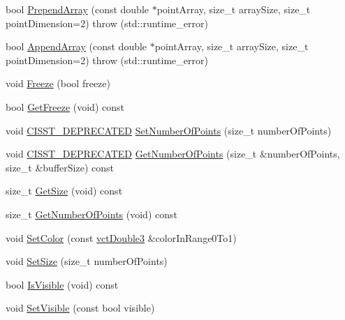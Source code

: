 \begin{DoxyCompactItemize}
\item 
bool \hyperlink{classvct_plot2_d_base_1_1_signal_a3a94c6565eb51445019fb41c4f1dc620}{Prepend\+Array} (const double $\ast$point\+Array, size\+\_\+t array\+Size, size\+\_\+t point\+Dimension=2)  throw (std\+::runtime\+\_\+error)
\item 
bool \hyperlink{classvct_plot2_d_base_1_1_signal_a3ca34a96793c8205973b5e21f6ccee83}{Append\+Array} (const double $\ast$point\+Array, size\+\_\+t array\+Size, size\+\_\+t point\+Dimension=2)  throw (std\+::runtime\+\_\+error)
\item 
void \hyperlink{classvct_plot2_d_base_1_1_signal_a64e25eabe599bfee8ce41e3bb413d10a}{Freeze} (bool freeze)
\item 
bool \hyperlink{classvct_plot2_d_base_1_1_signal_af589f83e274a70f465a700ddb33d95cd}{Get\+Freeze} (void) const 
\item 
void \hyperlink{cmn_portability_8h_a63da7164735f9501be651b1f2bbc0121}{C\+I\+S\+S\+T\+\_\+\+D\+E\+P\+R\+E\+C\+A\+T\+E\+D} \hyperlink{classvct_plot2_d_base_1_1_signal_ac2bc150d895d678d753ac2dd3e99ce25}{Set\+Number\+Of\+Points} (size\+\_\+t number\+Of\+Points)
\item 
void \hyperlink{cmn_portability_8h_a63da7164735f9501be651b1f2bbc0121}{C\+I\+S\+S\+T\+\_\+\+D\+E\+P\+R\+E\+C\+A\+T\+E\+D} \hyperlink{classvct_plot2_d_base_1_1_signal_aa85a26d0ae7863acb04f2d14cb5ed5a5}{Get\+Number\+Of\+Points} (size\+\_\+t \&number\+Of\+Points, size\+\_\+t \&buffer\+Size) const 
\item 
size\+\_\+t \hyperlink{classvct_plot2_d_base_1_1_signal_a3b291e4f8bcfe303086303cabea7ab1d}{Get\+Size} (void) const 
\item 
size\+\_\+t \hyperlink{classvct_plot2_d_base_1_1_signal_aae57a98944162e9eff828fcb35976ae5}{Get\+Number\+Of\+Points} (void) const 
\item 
void \hyperlink{classvct_plot2_d_base_1_1_signal_a0eae059cf46cd21594b8b30082a31a7c}{Set\+Color} (const \hyperlink{vct_fixed_size_vector_types_8h_a4a89122c9d7f72c3f31fe8126e17c3af}{vct\+Double3} \&color\+In\+Range0\+To1)
\item 
void \hyperlink{classvct_plot2_d_base_1_1_signal_ad3e1cca15d592cd22788ec4260da9de5}{Set\+Size} (size\+\_\+t number\+Of\+Points)
\item 
bool \hyperlink{classvct_plot2_d_base_1_1_signal_a106f7f6083ecde72ddbcfa923febc01f}{Is\+Visible} (void) const 
\item 
void \hyperlink{classvct_plot2_d_base_1_1_signal_ad20fd7a374f607e7ae5ddf632c58bc56}{Set\+Visible} (const bool visible)

\end{DoxyCompactItemize}
